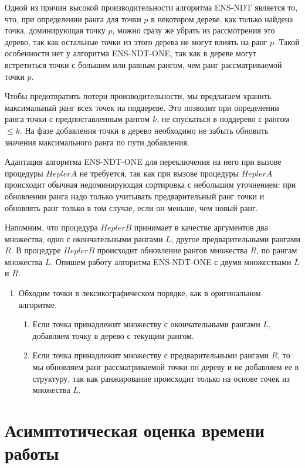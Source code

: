 Одной из причин высокой производительности алгоритма ENS-NDT является то, что, при определении ранга для точки $p$ в некотором дереве, как только найдена точка, доминирующая точку $p$, можно сразу же убрать из рассмотрения это дерево, так как остальные точки из этого дерева не могут влиять на ранг $p$. Такой особенности нет у алгоритма ENS-NDT-ONE, так как в дереве могут встретиться точки с большим или равным рангом, чем ранг рассматриваемой точки $p$.

Чтобы предотвратить потери производительности, мы предлагаем хранить максимальный ранг всех точек на поддереве. Это позволит при определении ранга точки с предпоставленным рангом $k$, не спускаться в поддерево с рангом $\leq k$. На фазе добавления точки в дерево необходимо не забыть обновить значения максимального ранга по пути добавления.

Адаптация алгоритма ENS-NDT-ONE для переключения на него при вызове процедуры $HeplerA$ не требуется, так как при вызове процедуры $HeplerA$ происходит обычная недоминирующая сортировка с небольшим уточнением: при обновлении ранга надо только учитывать предварительный ранг точки и обновлять ранг только в том случае, если он меньше, чем новый ранг. 

Напомним, что процедура $HeplerB$ принимает в качестве аргументов два множества, одно с окончательными рангами $L$, другое предварительными рангами $R$. В процедуре $HeplerB$ происходит обновление рангов множества $R$, по рангам множества $L$. Опишем работу алгоритма ENS-NDT-ONE с двумя множествами $L$ и $R$: 
\begin{enumerate}
  \item Обходим точки в лексикографическом порядке, как в оригинальном алгоритме.
  \begin{enumerate}
      \item Если точка принадлежит множеству с окончательными рангами $L$, добавляем точку в дерево с текущим рангом.
      \item Если точка принадлежит множеству с предварительными рангами $R$, то мы обновляем ранг рассматриваемой точки по дереву и не добавляем ее в структуру, так как ранжирование происходит только на основе точек из множества $L$.
  \end{enumerate}
\end{enumerate}

\section{Асимптотическая оценка времени работы}


